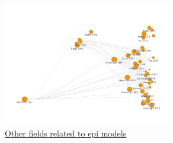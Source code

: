 \begin{figure}[!ht] \centering  %
	\caption{\href{https://app.litmaps.co/shared/07C0B3F0-B4A9-4627-923C-857F1ABFD2D3}{Other fields related to epi models}}
	\label{fig:graph_other}
	\centerline{\includegraphics[width=0.65\textwidth]{./figures/graph_other}}
\end{figure}